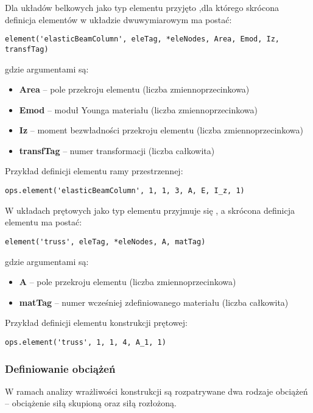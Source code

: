 Dla układów belkowych jako typ elementu przyjęto ,dla którego skrócona definicja elementów w układzie dwuwymiarowym ma postać:

\begin{lstlisting}
element('elasticBeamColumn', eleTag, *eleNodes, Area, Emod, Iz, transfTag)
\end{lstlisting}
gdzie argumentami są:
\begin{itemize}
    \item \textbf{Area} – pole przekroju elementu (liczba zmiennoprzecinkowa)
    \item \textbf{Emod} – moduł Younga materiału (liczba zmiennoprzecinkowa)
    \item \textbf{Iz} – moment bezwładności przekroju elementu (liczba zmiennoprzecinkowa)
    \item \textbf{transfTag} – numer transformacji (liczba całkowita)
\end{itemize}
Przykład definicji elementu ramy przestrzennej:

\begin{lstlisting}
ops.element('elasticBeamColumn', 1, 1, 3, A, E, I_z, 1)
\end{lstlisting}
W układach prętowych jako typ elementu przyjmuje się , a skrócona definicja elementu ma postać:

\begin{lstlisting}
element('truss', eleTag, *eleNodes, A, matTag)
\end{lstlisting}
gdzie argumentami są:
\begin{itemize}
    \item \textbf{A} – pole przekroju elementu (liczba zmiennoprzecinkowa)
    \item \textbf{matTag} – numer wcześniej zdefiniowanego materiału (liczba całkowita)
\end{itemize}
Przykład definicji elementu konstrukcji prętowej:

\begin{lstlisting}
ops.element('truss', 1, 1, 4, A_1, 1)
\end{lstlisting}

\subsubsection{Definiowanie obciążeń}

W ramach analizy wrażliwości konstrukcji są rozpatrywane dwa rodzaje obciążeń – obciążenie siłą skupioną oraz siłą rozłożoną.


